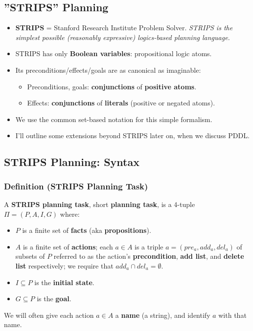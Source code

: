 \documentclass[conference, a4paper]{styles/acmsiggraph}
\begin{document}
    \subsection{''STRIPS'' Planning}
        \begin{itemize}
            \item \textbf{STRIPS} = Stanford Research Institute Problem Solver.\newline 
            \textit{STRIPS is the simplest possible (reasonably expressive) logics-based planning language.}
            \item STRIPS has only \textbf{Boolean variables}: propositional logic atoms.
            \item Its preconditions/effects/goals are as canonical as imaginable:
            \begin{itemize}
                \item Preconditions, goals: \textbf{conjunctions} of \textbf{positive atoms}.
                \item Effects: \textbf{conjunctions} of \textbf{literals} (positive or negated atoms).
            \end{itemize}
            \item We use the common set-based notation for this simple formalism.
            \item I'll outline some extensions beyond STRIPS later on, when we discuss PDDL.
        \end{itemize}
    
    \subsection{STRIPS Planning: Syntax}
        \subsubsection{Definition (STRIPS Planning Task)}
            A \textbf{STRIPS planning task}, short \textbf{planning task}, is a 4-tuple $\Pi = (P,A,I,G)$ where:
            \begin{itemize}
                \item $P$ is a finite set of \textbf{facts} (aka \textbf{propositions}).
                \item $A$ is a finite set of \textbf{actions}; each $a \in A$ is a triple $a = (pre_a,add_a,del_a)$ of subsets of $P$ referred to as the action's \textbf{precondition}, \textbf{add list}, and \textbf{delete list} respectively; we require that $add_a \cap del_a = \emptyset$.
                \item $I \subseteq P$ is the \textbf{initial state}.
                \item $G \subseteq P$ is the \textbf{goal}.
            \end{itemize}
            We will often give each action $a \in A$ a \textbf{name} (a string), and identify $a$ with that name.\newline
        
\end{document}
